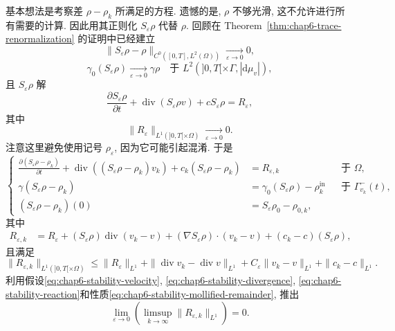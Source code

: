 \begin{sloppypar}
\begin{Proof}
\begin{itemize}
 基本想法是考察差 $\rho-\rho_k$ 所满足的方程. 遗憾的是, $\rho$ 不够光滑, 这不允许进行所有需要的计算. 因此用其正则化 $S_\varepsilon\rho$ 代替 $\rho$. 回顾在 Theorem~\ref{thm:chap6-trace-renormalization} 的证明中已经建立
 \begin{equation}
  \|S_\varepsilon\rho-\rho\|_{C^0([0,T],L^2(\Omega))}
  \xrightarrow[\varepsilon\to0]{}0,
 \label{eq:chap6-stability-mollified-interior}
 \end{equation}
 \begin{equation}
  \gamma_0(S_\varepsilon\rho)\xrightarrow[\varepsilon\to0]{}\gamma\rho
  \quad\text{于 }L^2(]0,T[\times\Gamma,|\mathrm d\mu_v|),
 \label{eq:chap6-stability-mollified-trace}
 \end{equation}
 且 $S_\varepsilon\rho$ 解
 \[
  \frac{\partial S_\varepsilon\rho}{\partial t}
  +\operatorname{div}(S_\varepsilon\rho v)+cS_\varepsilon\rho=R_\varepsilon,
 \]
 其中
 \begin{equation}
  \|R_\varepsilon\|_{L^1(]0,T[\times\Omega)}
  \xrightarrow[\varepsilon\to0]{}0.
 \label{eq:chap6-stability-mollified-remainder}
 \end{equation}
 注意这里避免使用记号 $\rho_\varepsilon$, 因为它可能引起混淆. 于是
 \[
 \left\{
 \begin{aligned}
 \frac{\partial(S_\varepsilon\rho-\rho_k)}{\partial t}
 +\operatorname{div}((S_\varepsilon\rho-\rho_k)v_k)
 +c_k(S_\varepsilon\rho-\rho_k)&=R_{\varepsilon,k}&&\text{于 }\Omega,\\
 \gamma(S_\varepsilon\rho-\rho_k)&=
 \gamma_0(S_\varepsilon\rho)-\rho_k^{\mathrm{in}}
 &&\text{于 }\Gamma_{v_k}^-(t),\\
 (S_\varepsilon\rho-\rho_k)(0)&=S_\varepsilon\rho_0-\rho_{0,k},
 \end{aligned}
 \right.
 \]
 其中
 \[
 \begin{aligned}
 R_{\varepsilon,k}
 &=R_\varepsilon+(S_\varepsilon\rho)\operatorname{div}(v_k-v)
 +(\nabla S_\varepsilon\rho)\cdot(v_k-v)
 +(c_k-c)(S_\varepsilon\rho),
 \end{aligned}
 \]
 且满足
 \[
 \|R_{\varepsilon,k}\|_{L^1(]0,T[\times\Omega)}
 \leq\|R_\varepsilon\|_{L^1}
 +\|\operatorname{div}v_k-\operatorname{div}v\|_{L^1}
 +C_\varepsilon\|v_k-v\|_{L^1}
 +\|c_k-c\|_{L^1}.
 \]
 利用假设\eqref{eq:chap6-stability-velocity}, \eqref{eq:chap6-stability-divergence}, \eqref{eq:chap6-stability-reaction}和性质\eqref{eq:chap6-stability-mollified-remainder}, 推出
 \begin{equation}
  \lim_{\varepsilon\to0}\left(\limsup_{k\to\infty}
  \|R_{\varepsilon,k}\|_{L^1}\right)=0.

\end{equation}
\end{itemize}
\end{Proof}
\end{sloppypar}
